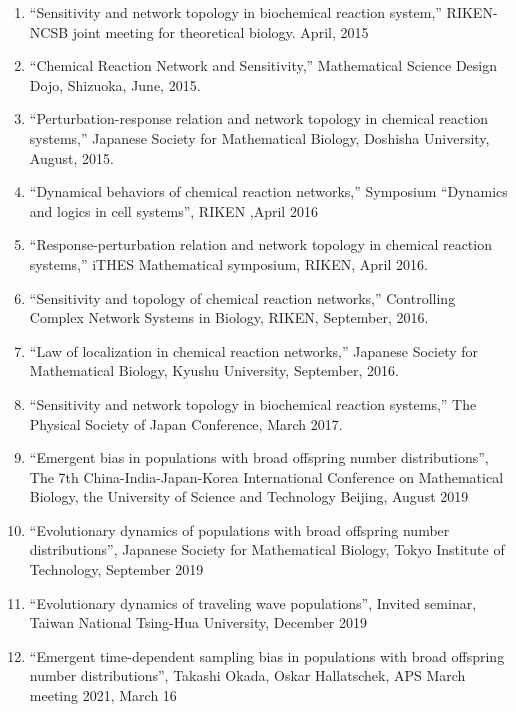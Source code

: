 \documentclass[letterpaper,12pt]{article}
\begin{document}
\begin{enumerate}


\subsection*{Biology}
\item ``Sensitivity and network topology in biochemical reaction system,'' RIKEN-NCSB joint meeting for theoretical biology. April, 2015
\item  ``Chemical Reaction Network and Sensitivity,'' Mathematical Science Design Dojo, Shizuoka, June, 2015.
\item  ``Perturbation-response relation and network topology in chemical reaction systems,'' Japanese Society for Mathematical Biology, Doshisha University, August, 2015.
\item ``Dynamical behaviors of chemical reaction networks,'' Symposium “Dynamics and logics in cell systems”, RIKEN ,April 2016
\item ``Response-perturbation relation and network topology in chemical reaction systems,'' iTHES Mathematical symposium, RIKEN, April 2016.
\item ``Sensitivity and topology of chemical reaction networks,'' Controlling Complex Network Systems in Biology, RIKEN, September, 2016.
\item ``Law of localization in chemical reaction networks,'' Japanese Society for Mathematical Biology, Kyushu University, September, 2016.
\item ``Sensitivity and network topology in biochemical reaction systems,'' The Physical Society of Japan Conference, March 2017.

\item ``Emergent bias in populations with broad offspring number distributions'',  The 7th China-India-Japan-Korea International Conference on Mathematical Biology, the University of Science and Technology Beijing, August 2019
\item ``Evolutionary dynamics of populations with broad offspring number distributions'',  Japanese Society for Mathematical Biology, Tokyo Institute of Technology, September 2019

\item ``Evolutionary dynamics of traveling wave populations'', Invited seminar, Taiwan National Tsing-Hua University,  December 2019


\item ``Emergent time-dependent sampling bias in populations with broad offspring number distributions'', Takashi Okada, Oskar Hallatschek, APS March meeting 2021, March 16


\end{enumerate}
\end{document}
